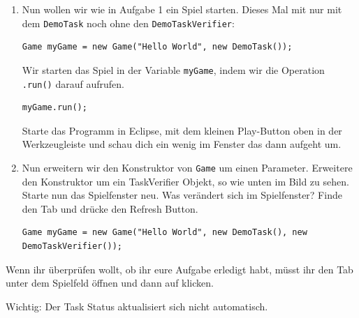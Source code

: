 

\begin{enumerate}
    \item Nun wollen wir wie in Aufgabe 1 ein Spiel starten. 
        Dieses Mal mit nur mit dem \lstinline{DemoTask} noch ohne den \lstinline{DemoTaskVerifier}:

    \begin{lstlisting}
Game myGame = new Game("Hello World", new DemoTask());
    \end{lstlisting}

    Wir starten das Spiel in der Variable \lstinline{myGame}, indem wir die Operation \lstinline{.run()} darauf aufrufen.

    \begin{lstlisting}
myGame.run();
    \end{lstlisting}

    Starte das Programm in Eclipse, mit dem kleinen Play-Button oben in der Werkzeugleiste und schau dich ein wenig im Fenster das dann aufgeht um.

    \item Nun erweitern wir den Konstruktor von \texttt{Game} um einen Parameter. 
        Erweitere den Konstruktor um ein TaskVerifier Objekt, so wie unten im Bild zu sehen. 
        Starte nun das Spielfenster neu. 
        Was verändert sich im Spielfenster? 
        Finde den  Tab und drücke den Refresh Button.

    \begin{lstlisting}
Game myGame = new Game("Hello World", new DemoTask(), new DemoTaskVerifier());
    \end{lstlisting}

\end{enumerate}


\begin{Infobox}
    Wenn ihr überprüfen wollt, ob ihr eure Aufgabe erledigt habt, müsst ihr den  Tab unter dem Spielfeld öffnen und dann auf  klicken.

    Wichtig: Der Task Status aktualisiert sich nicht automatisch.
\end{Infobox}


